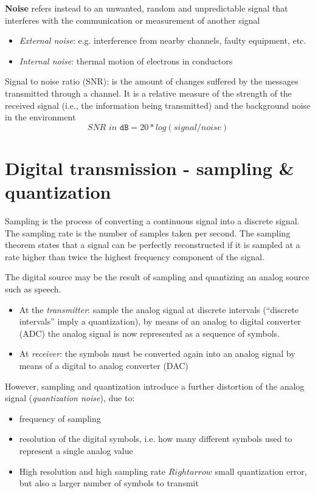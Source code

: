 \textbf{Noise} refers instead to an unwanted, random and unpredictable signal that interferes with the communication or measurement of another signal
\begin{itemize}
   \item \textit{External noise}: e.g. interference from nearby channels, faulty equipment, etc.
   \item \textit{Internal noise}: thermal motion of electrons in conductors
\end{itemize} 

Signal to noise ratio (SNR): is the amount of changes suffered by the messages transmitted through a channel.
It is a relative measure of the strength of the received signal (i.e., the information being transmitted) and the background noise in the environment
\[\textit{SNR in }\texttt{dB} = 20*log(signal/noise)\]

\section{Digital transmission - sampling \& quantization}
\begin{definition}[Sampling]
   Sampling is the process of converting a continuous signal into a discrete signal.
   The sampling rate is the number of samples taken per second.
   The sampling theorem states that a signal can be perfectly reconstructed if it is sampled at a rate higher than twice the highest frequency component of the signal.
\end{definition}

The digital source may be the result of sampling and quantizing an analog source
such as speech.
\begin{itemize}
   \item 
   At the \textit{transmitter}:
   sample the analog signal at discrete intervals (``discrete intervals'' imply a quantization), by
   means of an analog to digital converter (ADC)
   the analog signal is now represented as a sequence of symbols.
   \item
   At \textit{receiver}:
   the symbols must be converted again into an analog signal
   by means of a digital to analog converter (DAC)
\end{itemize}


However, sampling and quantization introduce a further distortion of the analog signal (\textit{quantization noise}), due to:
\begin{itemize}
   \item frequency of sampling
   \item resolution of the digital symbols, i.e. how many different symbols used to represent a single analog value
   \item[]
   High resolution and high sampling rate $Rightarrow$ small quantization error, but also a larger number of symbols to transmit
\end{itemize}

